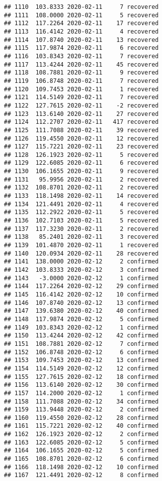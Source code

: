 \documentclass[
]{article}
\begin{document}
\begin{verbatim}
## 1110  103.8333 2020-02-11     7 recovered
## 1111  108.0000 2020-02-11     5 recovered
## 1112  117.2264 2020-02-11    17 recovered
## 1113  116.4142 2020-02-11     4 recovered
## 1114  107.8740 2020-02-11    13 recovered
## 1115  117.9874 2020-02-11     6 recovered
## 1116  103.8343 2020-02-11     7 recovered
## 1117  113.4244 2020-02-11    45 recovered
## 1118  108.7881 2020-02-11     9 recovered
## 1119  106.8748 2020-02-11     7 recovered
## 1120  109.7453 2020-02-11     1 recovered
## 1121  114.5149 2020-02-11     7 recovered
## 1122  127.7615 2020-02-11    -2 recovered
## 1123  113.6140 2020-02-11    27 recovered
## 1124  112.2707 2020-02-11   417 recovered
## 1125  111.7088 2020-02-11    39 recovered
## 1126  119.4550 2020-02-11    12 recovered
## 1127  115.7221 2020-02-11    23 recovered
## 1128  126.1923 2020-02-11     5 recovered
## 1129  122.6085 2020-02-11     6 recovered
## 1130  106.1655 2020-02-11     9 recovered
## 1131   95.9956 2020-02-11     2 recovered
## 1132  108.8701 2020-02-11     2 recovered
## 1133  118.1498 2020-02-11    14 recovered
## 1134  121.4491 2020-02-11     4 recovered
## 1135  112.2922 2020-02-11     5 recovered
## 1136  102.7103 2020-02-11     5 recovered
## 1137  117.3230 2020-02-11     2 recovered
## 1138   85.2401 2020-02-11     3 recovered
## 1139  101.4870 2020-02-11     1 recovered
## 1140  120.0934 2020-02-11    28 recovered
## 1141  138.0000 2020-02-12     2 confirmed
## 1142  103.8333 2020-02-12     3 confirmed
## 1143   -3.0000 2020-02-12     1 confirmed
## 1144  117.2264 2020-02-12    29 confirmed
## 1145  116.4142 2020-02-12    10 confirmed
## 1146  107.8740 2020-02-12    13 confirmed
## 1147  139.6380 2020-02-12    40 confirmed
## 1148  117.9874 2020-02-12     5 confirmed
## 1149  103.8343 2020-02-12     1 confirmed
## 1150  113.4244 2020-02-12    42 confirmed
## 1151  108.7881 2020-02-12     7 confirmed
## 1152  106.8748 2020-02-12     6 confirmed
## 1153  109.7453 2020-02-12    13 confirmed
## 1154  114.5149 2020-02-12    12 confirmed
## 1155  127.7615 2020-02-12    18 confirmed
## 1156  113.6140 2020-02-12    30 confirmed
## 1157  114.2000 2020-02-12     1 confirmed
## 1158  111.7088 2020-02-12    34 confirmed
## 1159  113.9448 2020-02-12     2 confirmed
## 1160  119.4550 2020-02-12    28 confirmed
## 1161  115.7221 2020-02-12    40 confirmed
## 1162  126.1923 2020-02-12     2 confirmed
## 1163  122.6085 2020-02-12     5 confirmed
## 1164  106.1655 2020-02-12     5 confirmed
## 1165  108.8701 2020-02-12     6 confirmed
## 1166  118.1498 2020-02-12    10 confirmed
## 1167  121.4491 2020-02-12     8 confirmed

\end{verbatim}
\end{document}
